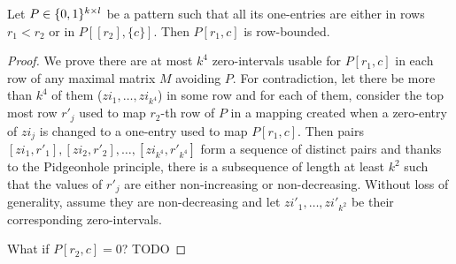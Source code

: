 \begin{lemma}
\label{lemma:cross}
Let $P\in\{0,1\}^{k\times l}$ be a pattern such that all its one-entries are either in rows $r_1<r_2$ or in $P[[r_2],\{c\}]$. Then $P[r_1,c]$ is row-bounded.
\end{lemma}
\begin{proof}
We prove there are at most $k^4$ zero-intervals usable for $P[r_1,c]$ in each row of any maximal matrix $M$ avoiding $P$. For contradiction, let there be more than $k^4$ of them ($zi_1,\dots,zi_{k^4}$) in some row and for each of them, consider the top most row $r'_j$ used to map $r_2$-th row of $P$ in a mapping created when a zero-entry of $zi_j$ is changed to a one-entry used to map $P[r_1,c]$. Then pairs $[zi_1,r'_1],[zi_2,r'_2],\dots,[zi_{k^4},r'_{k^4}]$ form a sequence of distinct pairs and thanks to the Pidgeonhole principle, there is a subsequence of length at least $k^2$ such that the values of $r'_j$ are either non-increasing or non-decreasing. Without loss of generality, assume they are non-decreasing and let $zi'_1,\dots,zi'_{k^2}$ be their corresponding zero-intervals.

What if $P[r_2,c]=0$? TODO
\end{proof}


